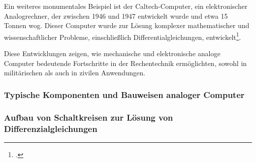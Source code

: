 Ein weiteres monumentales Beispiel ist der Caltech-Computer, ein elektronischer Analogrechner, der zwischen 1946 und 1947 entwickelt wurde und etwa 15 Tonnen wog. Dieser Computer wurde zur Lösung komplexer mathematischer und wissenschaftlicher Probleme, einschließlich Differentialgleichungen, entwickelt\footcite[Vgl. ][69]{ulmann2022analog}.

Diese Entwicklungen zeigen, wie mechanische und elektronische analoge Computer bedeutende Fortschritte in der Rechentechnik ermöglichten, sowohl in militärischen als auch in zivilen Anwendungen.

\subsubsection{Typische Komponenten und Bauweisen analoger Computer}

\subsubsection{Aufbau von Schaltkreisen zur Lösung von Differenzialgleichungen}
